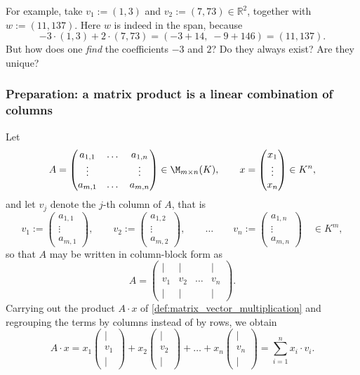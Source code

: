 For example, take $v_1 := (1,3)$ and $v_2 := (7,73) \in \mathbb{R}^2$, together with $w := (11, 137)$. Here $w$ is indeed in the span, because
\[
-3 \cdot (1,3) + 2 \cdot (7,73) = (-3 + 14, \; -9 + 146) = (11, 137).
\]
But how does one \emph{find} the coefficients $-3$ and $2$? Do they always exist? Are they unique?

\subsubsection{Preparation: a matrix product is a linear combination of columns}

Let
\[
A = \begin{pmatrix}
a_{1,1} & \dots & a_{1,n} \\
\vdots & & \vdots \\
a_{m,1} & \dots & a_{m,n}
\end{pmatrix} \in \M_{m \times n}(K),
\qquad
x = \begin{pmatrix} x_1 \\ \vdots \\ x_n \end{pmatrix} \in K^n,
\]
and let $v_j$ denote the $j$-th column of $A$, that is
\[
v_1 := \begin{pmatrix} a_{1,1} \\ \vdots \\ a_{m,1} \end{pmatrix},
\qquad
v_2 := \begin{pmatrix} a_{1,2} \\ \vdots \\ a_{m,2} \end{pmatrix},
\qquad \dots \qquad
v_n := \begin{pmatrix} a_{1,n} \\ \vdots \\ a_{m,n} \end{pmatrix}
\quad \in K^m,
\]
so that $A$ may be written in column-block form as
\[
A = \begin{pmatrix} | & | & & | \\ v_1 & v_2 & \dots & v_n \\ | & | & & | \end{pmatrix}.
\]
Carrying out the product $A \cdot x$ of \cref{def:matrix_vector_multiplication} and regrouping the terms by columns instead of by rows, we obtain
\begin{equation} \label{eq:product_is_combination}
A \cdot x
= x_1 \begin{pmatrix} | \\ v_1 \\ | \end{pmatrix}
+ x_2 \begin{pmatrix} | \\ v_2 \\ | \end{pmatrix}
+ \dots
+ x_n \begin{pmatrix} | \\ v_n \\ | \end{pmatrix}
= \sum_{i=1}^{n} x_i \cdot v_i.
\end{equation}

